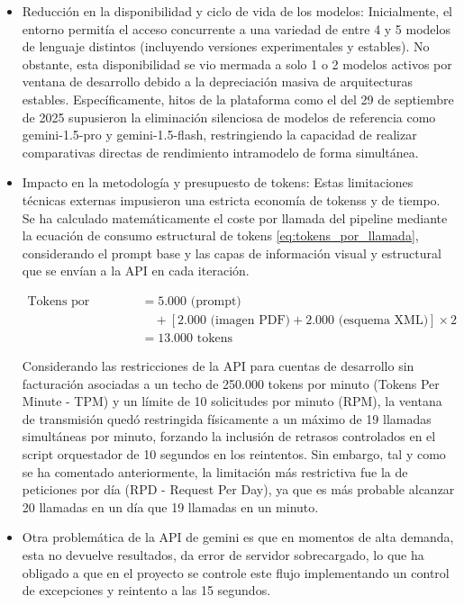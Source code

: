 \begin{itemize}
    * La disponibilidad de 500 RPD para gemini-3.1-flash-lite salió el 7 de Mayo de 2026, por lo que durante la fase de desarrollo del proyecto se trabajó con un límite de 20 RPD, lo que supuso una limitación en la ejecución de pruebas y experimentos.
    
    \item Reducción en la disponibilidad y ciclo de vida de los modelos: Inicialmente, el entorno permitía el acceso concurrente a una variedad de entre 4 y 5 modelos de lenguaje distintos (incluyendo versiones experimentales y estables). No obstante, esta disponibilidad se vio mermada a solo 1 o 2 modelos activos por ventana de desarrollo debido a la depreciación masiva de arquitecturas estables. Específicamente, hitos de la plataforma como el del 29 de septiembre de 2025 supusieron la eliminación silenciosa de modelos de referencia como gemini-1.5-pro y gemini-1.5-flash, restringiendo la capacidad de realizar comparativas directas de rendimiento intramodelo de forma simultánea.
    \item Impacto en la metodología y presupuesto de tokens: Estas limitaciones técnicas externas impusieron una estricta economía de tokenss   y de tiempo. Se ha calculado matemáticamente el coste por llamada del pipeline mediante la ecuación de consumo estructural de tokens \ref{eq:tokens_por_llamada}, considerando el prompt base y las capas de información visual y estructural que se envían a la API en cada iteración.


\begin{align}
\text{Tokens por llamada} &= 5.000 \text{ (prompt)} \\
&\quad + [2.000 \text{ (imagen PDF)} + 2.000 \text{ (esquema XML)}] \times 2 \\
&= 13.000 \text{ tokens}
\label{eq:tokens_por_llamada}
\end{align}

    Considerando las restricciones de la API para cuentas de desarrollo sin facturación asociadas a un techo de 250.000 tokens por minuto (Tokens Per Minute - TPM) y un límite de 10 solicitudes por minuto (RPM), la ventana de transmisión quedó restringida físicamente a un máximo de 19 llamadas simultáneas por minuto, forzando la inclusión de retrasos controlados en el script orquestador de 10 segundos en los reintentos. Sin embargo, tal y como se ha comentado anteriormente, la limitación más restrictiva fue la de peticiones por día (RPD - Request Per Day), ya que es más probable alcanzar 20 llamadas en un día que 19 llamadas en un minuto.
    \item Otra problemática de la API de gemini es que en momentos de alta demanda, esta no devuelve resultados, da error de servidor sobrecargado, lo que ha obligado a que en el proyecto se controle este flujo implementando un control de excepciones y reintento a las 15 segundos.
\end{itemize}

